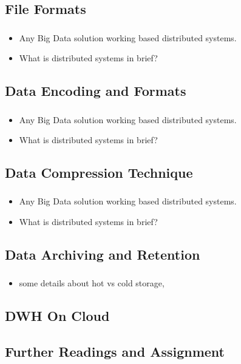 \subsection{File Formats}

\begin{frame}
    \frametitle{\subsecname}
    \begin{itemize}[<+->]
        \item Any Big Data solution working based distributed systems.
        \item What is distributed systems in brief?
    \end{itemize}
\end{frame}
\subsection{Data Encoding and Formats}

\begin{frame}
    \frametitle{\subsecname}
    \begin{itemize}[<+->]
        \item Any Big Data solution working based distributed systems.
        \item What is distributed systems in brief?
    \end{itemize}
\end{frame}
\subsection{Data Compression Technique}

\begin{frame}
    \frametitle{\subsecname}
    \begin{itemize}[<+->]
        \item Any Big Data solution working based distributed systems.
        \item What is distributed systems in brief?
    \end{itemize}
\end{frame}

\subsection{Data Archiving and Retention}
\begin{frame}
    \frametitle{\subsecname}
    \begin{itemize}[<+->]
        \item some details about hot vs cold storage,
    \end{itemize}
\end{frame}


\subsection{DWH On Cloud}



\subsection{Further Readings and Assignment}
